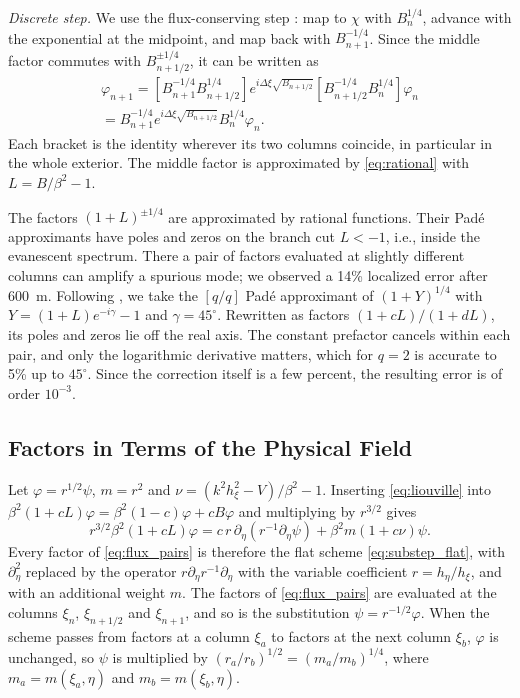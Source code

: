 \documentclass[journal]{IEEEtran}
\newcommand{\het}{\nu}
\newcommand{\pd}{\partial}
\begin{document}
\emph{Discrete step.} We use the flux-conserving step
\cite{collins1991energy,porter1991energy}: map to $\chi$ with $B_n^{1/4}$,
advance with the exponential at the midpoint, and map back with
$B_{n+1}^{-1/4}$. Since the middle factor commutes
with $B_{n+1/2}^{\pm1/4}$, it can be written as
\begin{multline}\label{eq:flux_pairs}
\varphi_{n+1}=\left[B_{n+1}^{-1/4}B_{n+1/2}^{1/4}\right]
e^{i\Delta\xi\sqrt{B_{n+1/2}}}
\left[B_{n+1/2}^{-1/4}B_n^{1/4}\right]\varphi_n\\
=B_{n+1}^{-1/4}e^{i\Delta\xi\sqrt{B_{n+1/2}}}B_n^{1/4}\varphi_n .
\end{multline}
Each bracket is the identity wherever its two columns coincide, in particular
in the whole exterior. The middle factor is approximated by \eqref{eq:rational}
with $L=B/\beta^2-1$.

The factors $(1+L)^{\pm1/4}$ are approximated by rational functions. Their Pad\'e
approximants have poles and zeros on the branch cut $L<-1$, i.e., inside the
evanescent spectrum. There a pair of factors evaluated at slightly different
columns can amplify a spurious mode; we observed a 14\% localized error after
\SI{600}{m}. Following \cite{milinazzo1997}, we take the $[q/q]$ Pad\'e
approximant of $(1+Y)^{1/4}$ with $Y=(1+L)e^{-i\gamma}-1$ and
$\gamma=45^\circ$. Rewritten as factors $(1+cL)/(1+dL)$, its poles and zeros
lie off the real axis. The constant prefactor cancels within each pair, and
only the logarithmic derivative matters, which for $q=2$ is accurate to 5\% up
to $45^\circ$. Since the correction itself is a few percent, the resulting
error is of order $10^{-3}$.

\subsection{Factors in Terms of the Physical Field}
Let $\varphi=r^{1/2}\psi$, $m=r^2$ and $\het=(k^2h_\xi^2-V)/\beta^2-1$.
Inserting \eqref{eq:liouville} into $\beta^2(1+cL)\varphi=\beta^2(1-c)\varphi+cB\varphi$
and multiplying by $r^{3/2}$ gives
\[
r^{3/2}\beta^2(1+cL)\varphi=c\,r\,\pd_\eta(r^{-1}\pd_\eta\psi)+\beta^2m(1+c\het)\psi .
\]
Every factor of \eqref{eq:flux_pairs} is therefore the flat scheme
\eqref{eq:substep_flat}, with $\pd_\eta^2$ replaced by the operator
$r\pd_\eta r^{-1}\pd_\eta$ with the variable coefficient $r=h_\eta/h_\xi$, and with
an additional weight $m$. The factors of \eqref{eq:flux_pairs} are evaluated at
the columns $\xi_n$, $\xi_{n+1/2}$ and $\xi_{n+1}$, and so is the substitution
$\psi=r^{-1/2}\varphi$. When the scheme passes from factors at a column $\xi_a$
to factors at the next column $\xi_b$, $\varphi$ is unchanged, so $\psi$ is
multiplied by $(r_a/r_b)^{1/2}=(m_a/m_b)^{1/4}$, where $m_a=m(\xi_a,\eta)$ and
$m_b=m(\xi_b,\eta)$.
\end{document}
